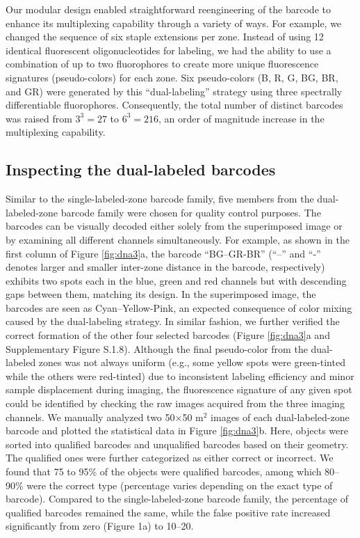 Our modular design enabled straightforward reengineering of the barcode to 
enhance its multiplexing capability through a variety of ways. For example, we changed 
the sequence of six staple extensions per zone. Instead of using 12 identical 
fluorescent oligonucleotides for labeling, we had the ability to use a combination of up 
to two fluorophores to create more unique fluorescence signatures (pseudo-colors) for 
each zone. Six pseudo-colors (B, R, G, BG, BR, and GR) were generated by this ``dual-labeling'' strategy using three spectrally differentiable fluorophores. Consequently, the 
total number of distinct barcodes was raised from $3^3=27$ to $6^3=216$,  
an order of magnitude increase in the multiplexing capability. 

\subsection{Inspecting the dual-labeled barcodes}
Similar to the single-labeled-zone barcode family, five members from the dual-labeled-zone barcode family were 
chosen for quality control purposes. The barcodes can be visually decoded either solely 
from the superimposed image or by examining all different channels simultaneously. For 
example, as shown in the first column of Figure \ref{fig:dna3}a, the barcode “BG--GR-BR” (“--” and 
“-” denotes larger and smaller inter-zone distance in the barcode, respectively) exhibits
two spots each in the blue, green and red channels but with descending gaps between 
them, matching its design. In the superimposed image, the barcodes are seen as Cyan--Yellow-Pink, an expected consequence of color mixing caused by the dual-labeling 
strategy. In similar fashion, we further verified the correct formation of the other four 
selected barcodes (Figure \ref{fig:dna3}a and Supplementary Figure S.1.8). Although the final pseudo-color from the dual-labeled zones was not always uniform (e.g., some yellow spots were green-tinted while 
the others were red-tinted) due to inconsistent labeling efficiency and minor sample 
displacement during imaging, the fluorescence signature of any given spot could be 
identified by checking the raw images acquired from the three imaging channels. We 
manually analyzed two 50×50 \textmu m$^2$ images of each dual-labeled-zone barcode and 
plotted the statistical data in Figure \ref{fig:dna3}b. Here, objects were sorted into qualified barcodes 
and unqualified barcodes based on their geometry. The qualified ones were further 
categorized as either correct or incorrect. We found that 75 to 95\% of the objects were 
qualified barcodes, among which 80–90\% were the correct type (percentage varies 
depending on the exact type of barcode). Compared to the single-labeled-zone barcode 
family, the percentage of qualified barcodes remained the same, while the false positive 
rate increased significantly from zero (Figure 1a) to 10–20.


